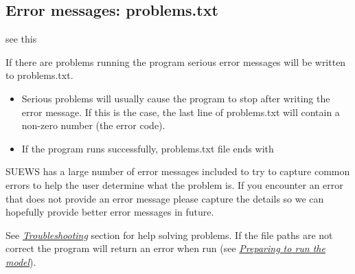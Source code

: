 \documentclass[letterpaper,10pt,english]{sphinxmanual}
\begin{document}
\subsection{Error messages: problems.txt}
\label{\detokenize{output-files:error-messages-problems-txt}}
see this {\hyperref[\detokenize{output-files:output-files}]{}}

If there are problems running the program serious error messages will be
written to problems.txt.
\begin{itemize}
\item {} 
Serious problems will usually cause the program to stop after writing
the error message. If this is the case, the last line of problems.txt
will contain a non-zero number (the error code).

\item {} 
If the program runs successfully, problems.txt file ends with

\end{itemize}

\begin{DUlineblock}{0em}
\item[] 
\item[] 
\end{DUlineblock}

SUEWS has a large number of error messages included to try to capture
common errors to help the user determine what the problem is. If you
encounter an error that does not provide an error message please capture
the details so we can hopefully provide better error messages in future.

See {\hyperref[\detokenize{output-files:Troubleshooting}]{\emph{Troubleshooting}}} section for help solving
problems. If the file paths are not correct the program will return an
error when run (see {\hyperref[\detokenize{output-files:Preparing_to_run_the_model}]{\emph{Preparing to run the
model}}}).
\end{document}
